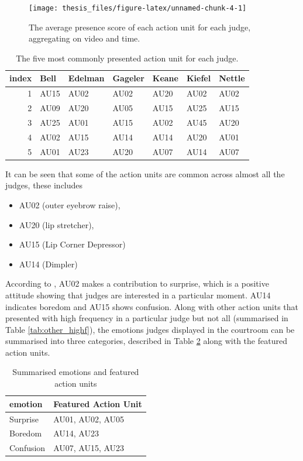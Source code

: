 \documentclass{monashthesis}
\begin{document}
\begin{figure}
\texttt{[image: thesis\_files/figure-latex/unnamed-chunk-4-1]} \caption{The average presence score of each action unit for each judge, aggregating on video and time. \label{fig:mean_presence}}\label{fig:unnamed-chunk-4}
\end{figure}

\begin{table}[t]

\caption{\label{tab:unnamed-chunk-5}\label{tab:most_common}The five most commonly presented action unit for each judge.}
\centering
\begin{tabular}{r|l|l|l|l|l|l}
\hline
index & Bell & Edelman & Gageler & Keane & Kiefel & Nettle\\
\hline
1 & AU15 & AU02 & AU02 & AU20 & AU02 & AU02\\
\hline
2 & AU09 & AU20 & AU05 & AU15 & AU25 & AU15\\
\hline
3 & AU25 & AU01 & AU15 & AU02 & AU45 & AU20\\
\hline
4 & AU02 & AU15 & AU14 & AU14 & AU20 & AU01\\
\hline
5 & AU01 & AU23 & AU20 & AU07 & AU14 & AU07\\
\hline
\end{tabular}
\end{table}

It can be seen that some of the action units are common across almost all the judges, these includes

\begin{itemize}
\tightlist
\item
  AU02 (outer eyebrow raise),
\item
  AU20 (lip stretcher),
\item
  AU15 (Lip Corner Depressor)
\item
  AU14 (Dimpler)
\end{itemize}

According to \textcite{ekman2002facial}, AU02 makes a contribution to surprise, which is a positive attitude showing that judges are interested in a particular moment. AU14 indicates boredom and AU15 shows confusion. Along with other action units that presented with high frequency in a particular judge but not all (summarised in Table \ref{tab:other_highf}), the emotions judges displayed in the courtroom can be summarised into three categories, described in Table \ref{tab:three_category} along with the featured action units.

\begin{table}[t]

\caption{\label{tab:unnamed-chunk-6}\label{tab:three_category} Summarised emotions and featured action units}
\centering
\begin{tabular}{l|l}
\hline
emotion & Featured Action Unit\\
\hline
Surprise & AU01, AU02, AU05\\
\hline
Boredom & AU14, AU23\\
\hline
Confusion & AU07, AU15, AU23\\
\hline
\end{tabular}
\end{table}
\end{document}
